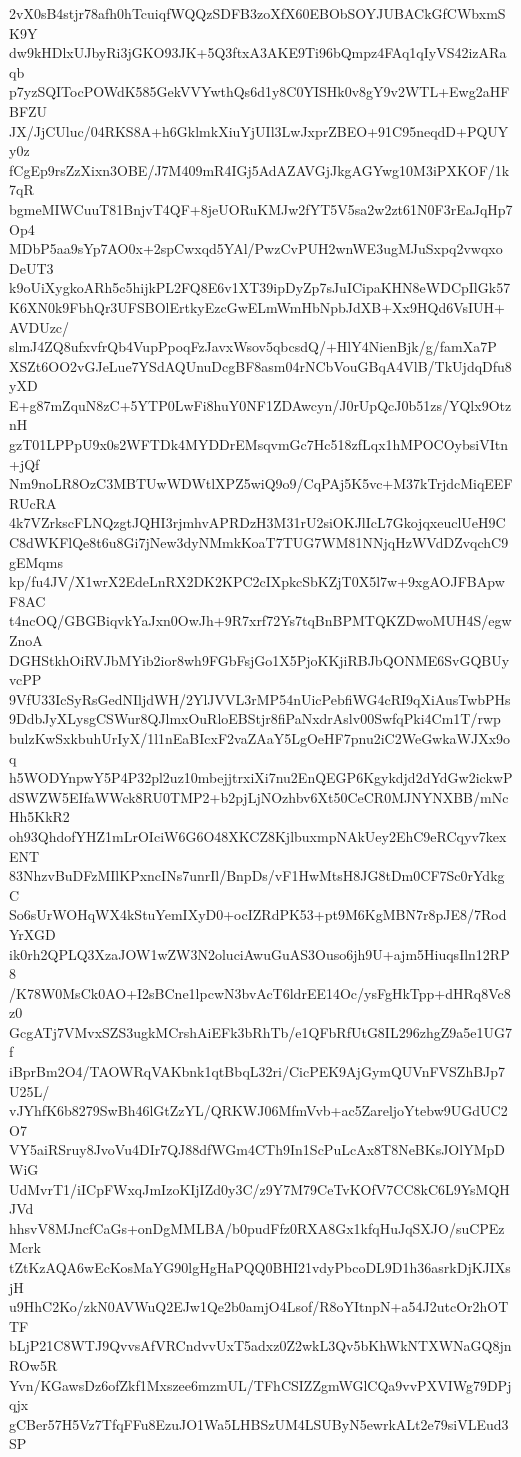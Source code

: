 2vX0sB4stjr78afh0hTcuiqfWQQzSDFB3zoXfX60EBObSOYJUBACkGfCWbxmSK9Y
dw9kHDlxUJbyRi3jGKO93JK+5Q3ftxA3AKE9Ti96bQmpz4FAq1qIyVS42izARaqb
p7yzSQITocPOWdK585GekVVYwthQs6d1y8C0YISHk0v8gY9v2WTL+Ewg2aHFBFZU
JX/JjCUluc/04RKS8A+h6GklmkXiuYjUIl3LwJxprZBEO+91C95neqdD+PQUYy0z
fCgEp9rsZzXixn3OBE/J7M409mR4IGj5AdAZAVGjJkgAGYwg10M3iPXKOF/1k7qR
bgmeMIWCuuT81BnjvT4QF+8jeUORuKMJw2fYT5V5sa2w2zt61N0F3rEaJqHp7Op4
MDbP5aa9sYp7AO0x+2spCwxqd5YAl/PwzCvPUH2wnWE3ugMJuSxpq2vwqxoDeUT3
k9oUiXygkoARh5c5hijkPL2FQ8E6v1XT39ipDyZp7sJuICipaKHN8eWDCpIlGk57
K6XN0k9FbhQr3UFSBOlErtkyEzcGwELmWmHbNpbJdXB+Xx9HQd6VsIUH+AVDUzc/
slmJ4ZQ8ufxvfrQb4VupPpoqFzJavxWsov5qbcsdQ/+HlY4NienBjk/g/famXa7P
XSZt6OO2vGJeLue7YSdAQUnuDcgBF8asm04rNCbVouGBqA4VlB/TkUjdqDfu8yXD
E+g87mZquN8zC+5YTP0LwFi8huY0NF1ZDAwcyn/J0rUpQcJ0b51zs/YQlx9OtznH
gzT01LPPpU9x0s2WFTDk4MYDDrEMsqvmGc7Hc518zfLqx1hMPOCOybsiVItn+jQf
Nm9noLR8OzC3MBTUwWDWtlXPZ5wiQ9o9/CqPAj5K5vc+M37kTrjdcMiqEEFRUcRA
4k7VZrkscFLNQzgtJQHI3rjmhvAPRDzH3M31rU2siOKJlIcL7GkojqxeuclUeH9C
C8dWKFlQe8t6u8Gi7jNew3dyNMmkKoaT7TUG7WM81NNjqHzWVdDZvqchC9gEMqms
kp/fu4JV/X1wrX2EdeLnRX2DK2KPC2cIXpkcSbKZjT0X5l7w+9xgAOJFBApwF8AC
t4ncOQ/GBGBiqvkYaJxn0OwJh+9R7xrf72Ys7tqBnBPMTQKZDwoMUH4S/egwZnoA
DGHStkhOiRVJbMYib2ior8wh9FGbFsjGo1X5PjoKKjiRBJbQONME6SvGQBUyvcPP
9VfU33IcSyRsGedNIljdWH/2YlJVVL3rMP54nUicPebfiWG4cRI9qXiAusTwbPHs
9DdbJyXLysgCSWur8QJlmxOuRloEBStjr8fiPaNxdrAslv00SwfqPki4Cm1T/rwp
bulzKwSxkbuhUrIyX/1l1nEaBIcxF2vaZAaY5LgOeHF7pnu2iC2WeGwkaWJXx9oq
h5WODYnpwY5P4P32pl2uz10mbejjtrxiXi7nu2EnQEGP6Kgykdjd2dYdGw2ickwP
dSWZW5EIfaWWck8RU0TMP2+b2pjLjNOzhbv6Xt50CeCR0MJNYNXBB/mNcHh5KkR2
oh93QhdofYHZ1mLrOIciW6G6O48XKCZ8KjlbuxmpNAkUey2EhC9eRCqyv7kexENT
83NhzvBuDFzMIlKPxncINs7unrIl/BnpDs/vF1HwMtsH8JG8tDm0CF7Sc0rYdkgC
So6sUrWOHqWX4kStuYemIXyD0+ocIZRdPK53+pt9M6KgMBN7r8pJE8/7RodYrXGD
ik0rh2QPLQ3XzaJOW1wZW3N2oluciAwuGuAS3Ouso6jh9U+ajm5HiuqsIln12RP8
/K78W0MsCk0AO+I2sBCne1lpcwN3bvAcT6ldrEE14Oc/ysFgHkTpp+dHRq8Vc8z0
GcgATj7VMvxSZS3ugkMCrshAiEFk3bRhTb/e1QFbRfUtG8IL296zhgZ9a5e1UG7f
iBprBm2O4/TAOWRqVAKbnk1qtBbqL32ri/CicPEK9AjGymQUVnFVSZhBJp7U25L/
vJYhfK6b8279SwBh46lGtZzYL/QRKWJ06MfmVvb+ac5ZareljoYtebw9UGdUC2O7
VY5aiRSruy8JvoVu4DIr7QJ88dfWGm4CTh9In1ScPuLcAx8T8NeBKsJOlYMpDWiG
UdMvrT1/iICpFWxqJmIzoKIjIZd0y3C/z9Y7M79CeTvKOfV7CC8kC6L9YsMQHJVd
hhsvV8MJncfCaGs+onDgMMLBA/b0pudFfz0RXA8Gx1kfqHuJqSXJO/suCPEzMcrk
tZtKzAQA6wEcKosMaYG90lgHgHaPQQ0BHI21vdyPbcoDL9D1h36asrkDjKJIXsjH
u9HhC2Ko/zkN0AVWuQ2EJw1Qe2b0amjO4Lsof/R8oYItnpN+a54J2utcOr2hOTTF
bLjP21C8WTJ9QvvsAfVRCndvvUxT5adxz0Z2wkL3Qv5bKhWkNTXWNaGQ8jnROw5R
Yvn/KGawsDz6ofZkf1Mxszee6mzmUL/TFhCSIZZgmWGlCQa9vvPXVIWg79DPjqjx
gCBer57H5Vz7TfqFFu8EzuJO1Wa5LHBSzUM4LSUByN5ewrkALt2e79siVLEud3SP
